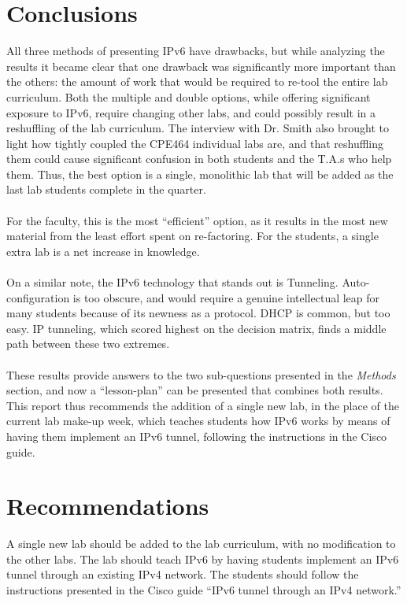 \documentclass[12pt]{article}
\begin{document}
\section{Conclusions}
All three methods of presenting IPv6 have drawbacks, but while analyzing the results it became clear that one drawback was significantly more important than the others: the amount of work that would be required to re-tool the entire lab curriculum. Both the multiple and double options, while offering significant exposure to IPv6, require changing other labs, and could possibly result in a reshuffling of the lab curriculum. The interview with Dr. Smith also brought to light how tightly coupled the CPE464 individual labs are, and that reshuffling them could cause significant confusion in both students and the T.A.s who help them. Thus, the best option is a single, monolithic lab that will be added as the last lab students complete in the quarter.\\\\
For the faculty, this is the most ``efficient'' option, as it results in the most new material from the least effort spent on re-factoring. For the students, a single extra lab is a net increase in knowledge.\\\\
On a similar note, the IPv6 technology that stands out is Tunneling. Auto-configuration is too obscure, and would require a genuine intellectual leap for many students because of its newness as a protocol. DHCP is common, but too easy. IP tunneling, which scored highest on the decision matrix, finds a middle path between these two extremes.\\\\
These results provide answers to the two sub-questions presented in the \textit{Methods} section, and now a ``lesson-plan'' can be presented that combines both results. This report thus recommends the addition of a single new lab, in the place of the current lab make-up week, which teaches students how IPv6 works by means of having them implement an IPv6 tunnel, following the instructions in the Cisco guide.

\section{Recommendations}
A single new lab should be added to the lab curriculum, with no modification to the other labs. The lab should teach IPv6 by having students implement an IPv6 tunnel through an existing IPv4 network. The students should follow the instructions presented in the Cisco guide ``IPv6 tunnel through an IPv4 network.''
\end{document}

